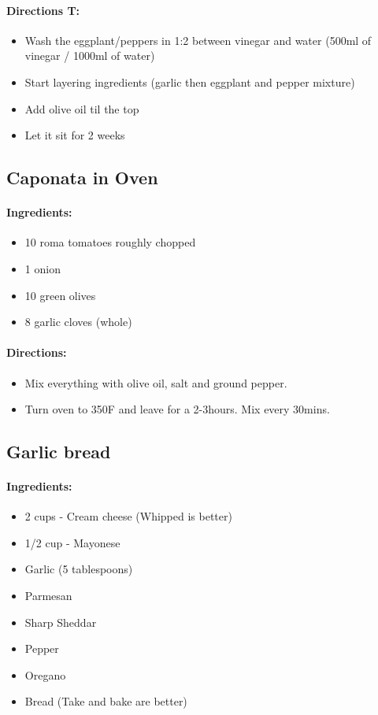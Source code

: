 \documentclass{article}
\begin{document}
\paragraph{Directions T:}
\begin{itemize}
	\item Wash the eggplant/peppers in 1:2 between vinegar and water (500ml of vinegar / 1000ml of water)
	\item Start layering ingredients (garlic then eggplant and pepper mixture)
	\item Add olive oil til the top
	\item Let it sit for 2 weeks
\end{itemize}

\subsection{Caponata in Oven}
\paragraph{Ingredients:}

\begin{itemize}
	\item 10 roma tomatoes roughly chopped
	\item 1 onion
	\item 10 green olives
	\item 8 garlic cloves (whole)
\end{itemize}

\paragraph{Directions:}
\begin{itemize}
	\item Mix everything with olive oil, salt and ground pepper.
	\item Turn oven to 350F and leave for a 2-3hours. Mix every 30mins.
\end{itemize}

\subsection{Garlic bread}

\paragraph{Ingredients:}

\begin{itemize}
	\item 2 cups - Cream cheese (Whipped is better)
	\item 1/2 cup - Mayonese 
	\item Garlic (5 tablespoons)
	\item Parmesan
	\item Sharp Sheddar
	\item Pepper
	\item Oregano
	\item Bread (Take and bake are better)
\end{itemize}
\end{document}
